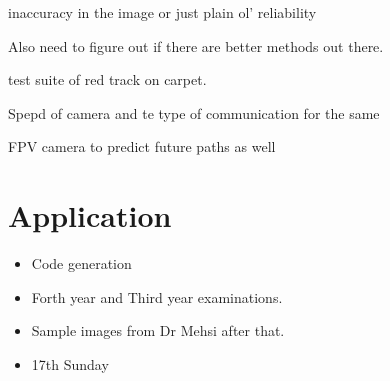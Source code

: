 \documentclass[11pt]{article}
\begin{document}
inaccuracy in the image or just plain ol' reliability

Also need to figure out if there are better methods out there.

test suite of red track on carpet.

Spepd of camera and te type of communication for the same

FPV camera to predict future paths as well

\section{Application}
\label{sec:orgd23839b}

\begin{itemize}
\item Code generation

\item Forth year and Third year examinations.
\item Sample images from Dr Mehsi after that.

\item 17th Sunday
\end{itemize}
\end{document}
